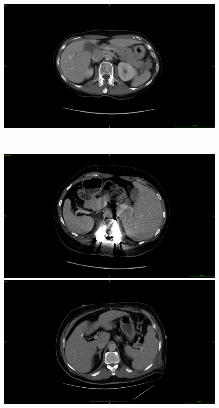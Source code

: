{\begin{figure}[!ht]
\begin{mdframed}[backgroundcolor=blue!50,linecolor=blue!50]
\begin{minipage}{6cm}
		\end{minipage} \hspace{-0.1cm}
		\begin{minipage}{6cm}
			\includegraphics[width=\linewidth]{images/Artifacts/TCIA-BC-A3KF_fatAccumulation}
		\end{minipage} \\
		\begin{minipage}{6cm}
			\includegraphics[width=\linewidth]{images/Artifacts/LITS_pat30_metallicArtifacts}
		\end{minipage} \hspace{-0.1cm}
		\begin{minipage}{6cm}
			\includegraphics[width=\linewidth]{images/Artifacts/TCIA-DD-A3A0_slice32_metallic_artifacts}

\end{minipage}
\end{mdframed}
\end{figure}}
